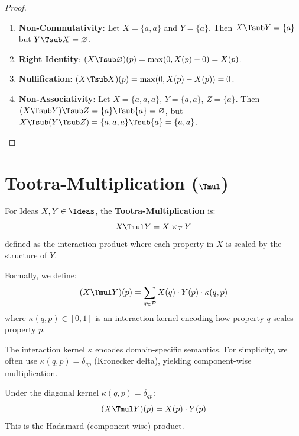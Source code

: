 \begin{proof}
\begin{enumerate}
  \item \textbf{Non-Commutativity}: Let $X = \{a, a\}$ and $Y = \{a\}$. Then $X \Tsub Y = \{a\}$ but $Y \Tsub X = \varnothing$.

  \item \textbf{Right Identity}: $(X \Tsub \varnothing)(p) = \max(0, X(p) - 0) = X(p)$.

  \item \textbf{Nullification}: $(X \Tsub X)(p) = \max(0, X(p) - X(p)) = 0$.

  \item \textbf{Non-Associativity}: Let $X = \{a, a, a\}$, $Y = \{a, a\}$, $Z = \{a\}$. Then $(X \Tsub Y) \Tsub Z = \{a\} \Tsub \{a\} = \varnothing$, but $X \Tsub (Y \Tsub Z) = \{a,a,a\} \Tsub \{a\} = \{a, a\}$.
\end{enumerate}
\end{proof}

\section{Tootra-Multiplication ($\Tmul$)}

\begin{definition}
\label{def:tootra-mul}
For Ideas $X, Y \in \Ideas$, the \textbf{Tootra-Multiplication} is:
\[
X \Tmul Y = X \times_T Y
\]
defined as the interaction product where each property in $X$ is scaled by the structure of $Y$.

Formally, we define:
\[
(X \Tmul Y)(p) = \sum_{q \in \mathcal{P}} X(q) \cdot Y(p) \cdot \kappa(q, p)
\]
where $\kappa(q, p) \in [0, 1]$ is an interaction kernel encoding how property $q$ scales property $p$.
\end{definition}

\begin{remark}
The interaction kernel $\kappa$ encodes domain-specific semantics. For simplicity, we often use $\kappa(q, p) = \delta_{qp}$ (Kronecker delta), yielding component-wise multiplication.
\end{remark}

\begin{definition}
\label{def:tootra-mul-simple}
Under the diagonal kernel $\kappa(q,p) = \delta_{qp}$:
\[
(X \Tmul Y)(p) = X(p) \cdot Y(p)
\]
This is the Hadamard (component-wise) product.
\end{definition}

